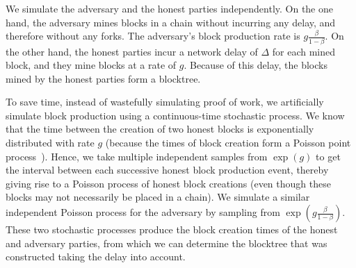 We simulate the adversary and the honest parties independently. On the one hand, the adversary mines blocks
in a chain without incurring any delay, and therefore without any forks. The adversary's block production rate is
$g\frac{\beta}{1 - \beta}$. On the other hand, the honest parties incur a network delay of $\Delta$ for each mined block,
and they mine blocks at a rate of $g$. Because of this delay, the blocks mined by the honest parties form a blocktree.

To save time, instead of wastefully simulating proof of work, we artificially simulate block production using a
continuous-time stochastic process.
We know that the time between the creation of two honest blocks is exponentially distributed
with rate $g$ (because the times of block creation form a Poisson point process~\cite{bitcoin-made-simple}).
Hence, we take multiple independent samples from $\exp(g)$ to get the interval between each successive honest block production event,
thereby giving rise to a Poisson process of honest block creations (even though these blocks may not necessarily be placed in a chain).
We simulate a similar independent Poisson process for the adversary
by sampling from $\exp(g\frac{\beta}{1 - \beta})$. These two stochastic processes produce the block creation times of the honest and
adversary parties, from which we can determine the blocktree that was constructed taking the delay into account.

